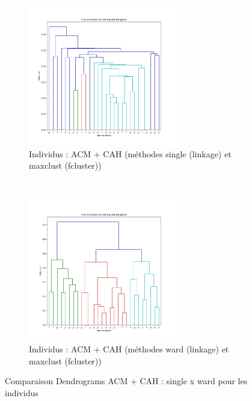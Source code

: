     \begin{figure}[!htb]
        \begin{subfigure}[b]{1.0\textwidth}
            \centering
            \includegraphics[width=0.71\textwidth]{img/mixte_acm_cah/Dendrogram_individus_'single'_'maxclust'.jpg}
            \caption{Individus : ACM + CAH (méthodes single (linkage) et maxclust (fcluster))}
            \label{Label_ACM_Dendrogram_individus_'single'_'maxclust'.jpg}
        \end{subfigure}
        \\
        \begin{subfigure}[b]{1.0\textwidth}
            \centering
            \includegraphics[width=0.71\textwidth]{img/mixte_acm_cah/Dendrogram_individus_'ward'_'maxclust'.jpg}
            \caption{Individus : ACM + CAH (méthodes ward (linkage) et maxclust (fcluster))}
            \label{Label_ACM_Dendrogram_individus_'ward'_'maxclust'.jpg}
        \end{subfigure}
        \caption{Comparaison Dendrograms ACM + CAH : single x ward pour les individus}
    \end{figure}
    

